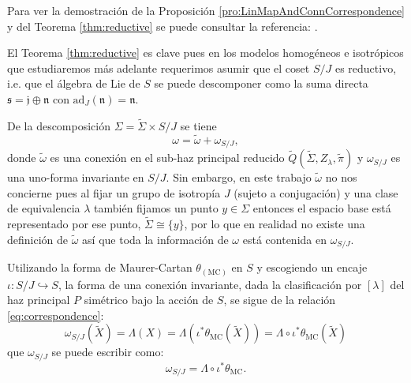 Para ver la demostraci\'{o}n de la Proposici\'{o}n \autoref{pro:LinMapAndConnCorrespondence} y del Teorema \autoref{thm:reductive} se puede consultar la referencia: \cite{Kobayashi}.

El Teorema \autoref{thm:reductive} es clave pues en los modelos homog\'{e}neos e isotr\'{o}picos que estudiaremos m\'{a}s adelante requerimos asumir que el coset $S/J$ es reductivo, i.e. que el  \'{a}lgebra de Lie de $S$ se puede descomponer como la suma directa $\mathfrak{s} = \mathfrak{j} \oplus \mathfrak{n}$ con $\mathrm{ad}_{J}(\mathfrak{n}) = \mathfrak{n}$.

De la descomposici\'{o}n $\Sigma = \tilde{\Sigma} \times S/J$ se tiene
%
\begin{equation}
\omega = \tilde{\omega} + \omega_{S/J},
\end{equation}
%
donde $\tilde{\omega}$ es una conexi\'{o}n en el sub-haz principal reducido $\tilde{Q}(\tilde{\Sigma}, Z_{\lambda}, \tilde{\pi})$ y $\omega_{S/J}$ es una uno-forma invariante en $S/J$. Sin embargo, en este trabajo $\tilde{\omega}$ no nos concierne pues al fijar un grupo de isotrop\'{i}a $J$ (sujeto a conjugaci\'{o}n) y una clase de equivalencia $\lambda$ tambi\'{e}n fijamos un punto $y \in \Sigma$ entonces el espacio base est\'{a} representado por ese punto, $\tilde{\Sigma} \cong \{y\}$, por lo que en realidad no existe una definici\'{o}n de $\tilde{\omega}$ as\'{i} que toda la informaci\'{o}n de $\omega$ est\'{a} contenida en $\omega_{S/J}$.

Utilizando la forma de Maurer-Cartan $\theta_{(\mathrm{MC})}$ en $S$ y escogiendo un encaje $\iota: S/J \hookrightarrow S$, la forma de una conexi\'{o}n invariante, dada la clasificaci\'{o}n por $[\lambda]$ del haz principal $P$ sim\'{e}trico bajo la acci\'{o}n de $S$, se sigue de la relaci\'{o}n \eqref{eq:correspondence}:
%
\begin{equation*}
\omega_{S/J} (\tilde{X}) = \Lambda (X) = \Lambda (\iota^{*} \theta_{\mathrm{MC}} (\tilde{X})) = \Lambda \circ \iota^{*} \theta_{\mathrm{MC}} (\tilde{X})
\end{equation*}
%
que $\omega_{S/J}$ se puede escribir como:
%
\begin{equation}
\omega_{S/J} = \Lambda \circ \iota^{*} \theta_{\mathrm{MC}}.
\end{equation}